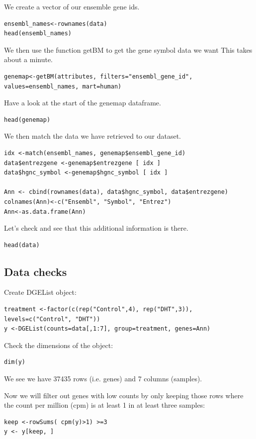 \begin{steps}
\begin{steps}
We create a vector of our ensemble gene ids.
\begin{lstlisting}
ensembl_names<-rownames(data)
head(ensembl_names)
\end{lstlisting}

We then use the function getBM to get the gene symbol data we want
This takes about a minute.

\begin{lstlisting}
genemap<-getBM(attributes, filters="ensembl_gene_id", values=ensembl_names, mart=human)
\end{lstlisting}

Have a look at the start of the genemap dataframe.

\begin{lstlisting}
head(genemap)
\end{lstlisting}


We then match the data we have retrieved to our dataset.

\begin{lstlisting}
idx <-match(ensembl_names, genemap$ensembl_gene_id)
data$entrezgene <-genemap$entrezgene [ idx ]
data$hgnc_symbol <-genemap$hgnc_symbol [ idx ]

Ann <- cbind(rownames(data), data$hgnc_symbol, data$entrezgene)
colnames(Ann)<-c("Ensembl", "Symbol", "Entrez")
Ann<-as.data.frame(Ann)
\end{lstlisting}

Let’s check and see that this additional information is there.
\begin{lstlisting}
head(data)
\end{lstlisting}

\end{steps}

\subsection{Data checks}
Create DGEList object:
\begin{lstlisting}
treatment <-factor(c(rep("Control",4), rep("DHT",3)), levels=c("Control", "DHT"))
y <-DGEList(counts=data[,1:7], group=treatment, genes=Ann)
\end{lstlisting}



Check the dimensions of the object:
\begin{lstlisting}
dim(y)
\end{lstlisting}

We see we have 37435 rows (i.e. genes) and 7 columns (samples).

Now we will filter out genes with low counts by only keeping those rows where the count
per million (cpm) is at least 1 in at least three samples:
\begin{lstlisting}
keep <-rowSums( cpm(y)>1) >=3
y <- y[keep, ]
\end{lstlisting}

\end{steps}


